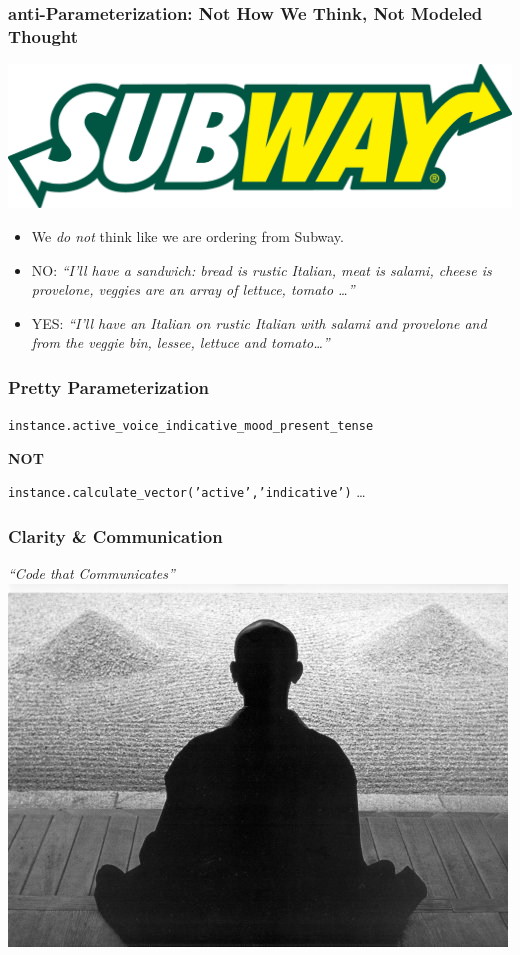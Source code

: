 \documentclass[slidestop,compress,mathserif]{beamer}
\begin{document}
\begin{frame}
	\frametitle{anti-Parameterization:  Not How We Think, Not Modeled Thought}

		\begin{center}
			\includegraphics[scale=0.15]{img/SubwayLogo.png}
		\end{center}			

	\begin{itemize}
		\item We \emph{do not} think like we are ordering from Subway.
		\pause
		\item NO:  \emph{``I'll have a sandwich:  bread is rustic Italian, meat is salami, cheese is provelone, veggies are an array of lettuce, tomato \ldots''}
		\pause
		\item YES:  \emph{``I'll have an Italian on rustic Italian with salami and provelone and from the veggie bin, lessee, lettuce and tomato\ldots''}
	\end{itemize}
	
\end{frame}

\begin{frame}
	\frametitle{Pretty Parameterization}		
	\texttt{instance.active\_voice\_indicative\_mood\_present\_tense}
	\begin{center}
		\textbf{NOT}
	\end{center}
	\texttt{instance.calculate\_vector('active','indicative')} \ldots
\end{frame}

\begin{frame}
	\frametitle{Clarity \& Communication}
	\begin{center}
		\emph{``Code that Communicates''}
		\includegraphics[scale=0.45]{img/Zen04.jpg}
	\end{center}
\end{frame}
\end{document}
